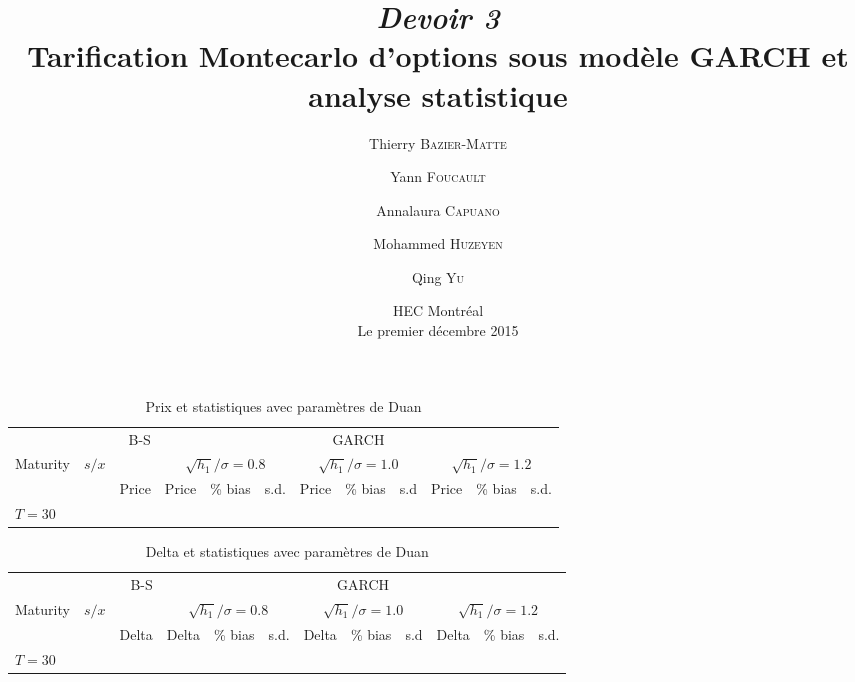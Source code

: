 \documentclass[12pt,fleqn]{article}
\title{\textit{Devoir 3}\\Tarification Montecarlo d'options sous modèle GARCH et analyse statistique}
\date{HEC Montréal\\[4em]Le premier décembre 2015}
\author{Thierry \textsc{Bazier-Matte} \and Yann \textsc{Foucault} \and Annalaura
  \textsc{Capuano} \and Mohammed \textsc{Huzeyen} \and Qing \textsc{Yu}}
\begin{document}
\maketitle

\newpage
{}
\thispagestyle{empty}

\begin{sidewaystable}
\caption{Prix et statistiques avec paramètres de Duan}
\bigskip
\begin{tabular}{llrrrrrrrrrr}
\toprule
& & B-S & \multicolumn{9}{c}{GARCH}\\
\cmidrule{4-12}
Maturity & $s/x$ && \multicolumn{3}{c}{$\sqrt{h_1}/\sigma = 0.8$} & \multicolumn{3}{c}{$\sqrt{h_1}/\sigma = 1.0$} & \multicolumn{3}{c}{$\sqrt{h_1}/\sigma = 1.2$}\\
& & Price & Price & \% bias & s.d. & Price & \% bias & s.d & Price & \% bias & s.d.\\
\midrule
\multirow{7}{*}{$T=30$} 

\midrule
\multirow{7}{*}{$T=90$}

\midrule
\multirow{7}{*}{$T=180$}

\bottomrule
\end{tabular}
\end{sidewaystable}


\newpage
{}
\thispagestyle{empty}

\begin{sidewaystable}[h!]
\caption{Delta et statistiques avec paramètres de Duan}
\bigskip
\begin{tabular}{llrrrrrrrrrr}
\toprule
& & B-S & \multicolumn{9}{c}{GARCH}\\
\cmidrule{4-12}
Maturity & $s/x$ && \multicolumn{3}{c}{$\sqrt{h_1}/\sigma = 0.8$} & \multicolumn{3}{c}{$\sqrt{h_1}/\sigma = 1.0$} & \multicolumn{3}{c}{$\sqrt{h_1}/\sigma = 1.2$}\\
& & Delta & Delta & \% bias & s.d. & Delta & \% bias & s.d & Delta & \% bias & s.d.\\
\midrule
\multirow{7}{*}{$T=30$} 

\midrule
\multirow{7}{*}{$T=90$}

\midrule
\multirow{7}{*}{$T=180$}

\bottomrule
\end{tabular}
\end{sidewaystable}

\end{document}
